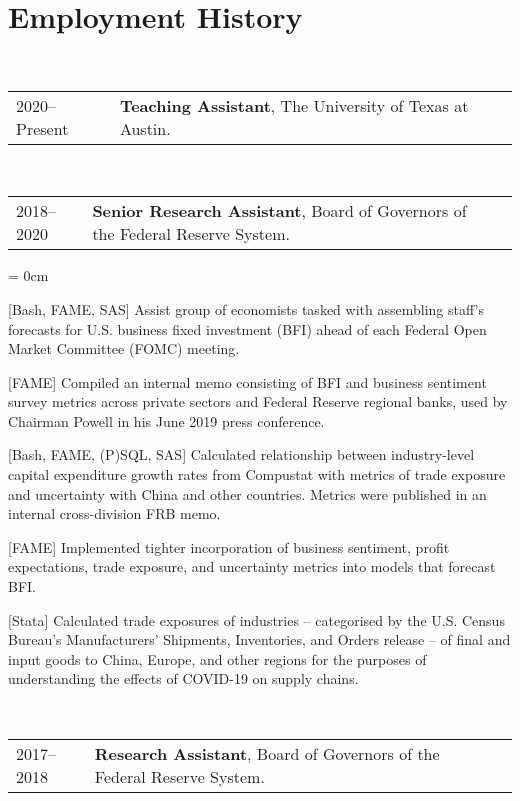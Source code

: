 \documentclass[a4paper, 11pt]{article}
\begin{document}
  \section{Employment History}
     ~\begin{tabular}{llP{15cm}}
      2020--Present & \textbf{Teaching Assistant}, The University of Texas at Austin.
    \end{tabular}
    \vspace*{1em}
    ~\begin{tabular}{llP{15cm}}
      2018--2020 & \textbf{Senior Research Assistant}, Board of Governors of the Federal Reserve System.
    \end{tabular}
    \begin{compactitem}\parskip = 0cm
      \item {[Bash, FAME, SAS]} Assist group of economists tasked with assembling staff's forecasts for U.S. business fixed investment (BFI) ahead of each Federal Open Market Committee (FOMC) meeting.
      \item {[FAME]} Compiled an internal memo consisting of BFI and business sentiment survey metrics across private sectors and Federal Reserve regional banks, used by Chairman Powell in his June 2019 press conference.
      \item {[Bash, FAME, (P)SQL, SAS]} Calculated relationship between industry-level capital expenditure growth rates from Compustat with metrics of trade exposure and uncertainty with China and other countries. Metrics were published in an internal cross-division FRB memo.
      \item {[FAME]} Implemented tighter incorporation of business sentiment, profit expectations, trade exposure, and uncertainty metrics into models that forecast BFI.
      \item {[Stata]} Calculated trade exposures of industries -- categorised by the U.S. Census Bureau's Manufacturers' Shipments, Inventories, and Orders release -- of final and input goods to China, Europe, and other regions for the purposes of understanding the effects of COVID-19 on supply chains.
    \end{compactitem}
    \vspace*{1em}
    ~\begin{tabular}{llP{15cm}}
      2017--2018 & \textbf{Research Assistant}, Board of Governors of the Federal Reserve System.
    \end{tabular}
\end{document}
